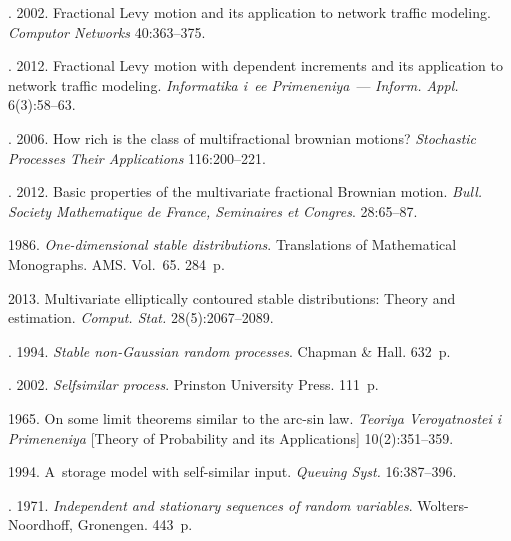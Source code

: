   \begin{multicols}{2}

\renewcommand{\bibname}{\protect\rmfamily References}

{\small\frenchspacing
 {%
 \begin{thebibliography}{99}
. 
2002. Fractional Levy motion and its application 
to network traffic modeling.  \textit{Computor Networks} 40:363--375. 

.  
2012. Fractional Levy 
motion with dependent increments and its application to network traffic modeling.
\textit{Informatika i~ee Primeneniya}~--- \textit{Inform. Appl.} 6(3):58--63.  


. 2006. How rich is the class of multifractional brownian
motions?  \textit{Stochastic Processes Their Applications}  116:200--221.

.  2012. 
Basic properties of the multivariate fractional Brownian motion. 
\textit{Bull. Society Mathematique de France, Seminaires et Congres}. 28:65--87. 




 1986. \textit{One-dimensional stable distributions}.  
Translations of Mathematical Monographs. AMS. Vol.~65. 284~p. 


 2013.  Multivariate elliptically contoured stable distributions: 
Theory and estimation.   
\textit{Comput. Stat.} 28(5):2067--2089. 

. 1994. 
\textit{Stable non-Gaussian random processes}. 
Chapman \& Hall. 632~p.  

. 2002.  \textit{Selfsimilar process}. 
Prinston University Press. 111~p. 

 1965.
On some limit theorems similar to the arc-sin law. 
\textit{Teoriya Veroyatnostei i Primeneniya} 
[Theory of Probability and its Applications] 10(2):351--359. 

  1994. 
A~storage model with self-similar input. \textit{Queuing Syst.} 16:387--396. 

. 1971.  
\textit{Independent and stationary sequences of 
random variables}.  Wolters-Noordhoff, Gronengen. 443~p. 
  \end{thebibliography}

 }
 }

\end{multicols}

